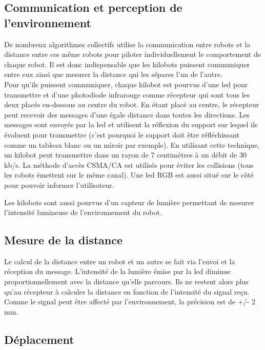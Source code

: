 \documentclass[a4paper,8pt]{report}
\begin{document}
\subsection*{Communication et perception de l'environnement}\label{subsec:name}

De nombreux algorithmes collectifs utilise la communication entre robots et la distance entre ces m\^eme robots pour piloter individuellement le comportement de chaque robot. Il est donc indispensable que les kilobots puissent communiquer entre eux ainsi que mesurer la distance qui les s\'epares l'un de l'autre. \\
Pour qu'ils puissent communiquer, chaque kilobot est pourvus d'une led pour transmettre et d'une photodiode infrarouge comme r\'ecepteur qui sont tous les deux plac\'es en-dessous au centre du robot. En \'etant plac\'e au centre, le r\'ecepteur peut recevoir des messages d'une \'egale distance dans toutes les directions. Les messages sont envoy\'es par la led et utilisent la r\'eflexion du support sur lequel ils \'evoluent pour transmettre (c'est pourquoi le support doit \^etre r\'efl\'echissant comme un tableau blanc ou un miroir par exemple). En utilisant cette technique, un kilobot peut transmettre dans un rayon de 7 centim\`etres \`a un d\'ebit de 30 kb/s. La m\'ethode d'acc\`es CSMA/CA est utilis\'es pour \'eviter les collisions (tous les robots \'emettent sur le m\^eme canal).
Une led RGB est aussi situ\'e sur le c\^ot\'e pour pouvoir informer l'utilisateur.

\smallskip
Les kilobots sont aussi pourvus d'un capteur de lumi\`ere permettant de mesurer l'intensit\'e lumineuse de l'environnement du robot.

\subsection*{Mesure de la distance}\label{subsec:name}

Le calcul de la distance entre un robot et un autre se fait via l'envoi et la r\'eception du message. L'intensit\'e de la lumi\`ere \'emise par la led diminue proportionnellement avec la distance qu'elle parcours. Ils ne restent alors plus qu'au r\'ecepteur \`a calculer la distance en fonction de l'intensit\'e du signal reçu. Comme le signal peut \^etre affect\'e par l'environnement, la pr\'ecision est de +/- 2 mm.

\subsection*{D\'eplacement}\label{subsec:name}
\end{document}
